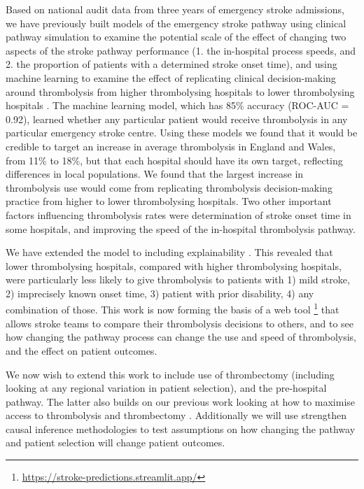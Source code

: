 Based on national audit data from three years of emergency stroke admissions, we have previously built models of the emergency stroke pathway using clinical pathway simulation to examine the potential scale of the effect of changing two aspects of the stroke pathway performance (1. the in-hospital process speeds, and 2. the proportion of patients with a determined stroke onset time), and using machine learning to examine the effect of replicating clinical decision-making around thrombolysis from higher thrombolysing hospitals to lower thrombolysing hospitals \cite{allen_using_2022, allen_use_2022}. The machine learning model, which has 85\% accuracy (ROC-AUC = 0.92), learned whether any particular patient would receive thrombolysis in any particular emergency stroke centre. Using these models we found that it would be credible to target an increase in average thrombolysis in England and Wales, from 11\% to 18\%, but that each hospital should have its own target, reflecting differences in local populations. We found that the largest increase in thrombolysis use would come from replicating thrombolysis decision-making practice from higher to lower thrombolysing hospitals. Two other important factors influencing thrombolysis rates were determination of stroke onset time in some hospitals, and improving the speed of the in-hospital thrombolysis pathway.

We have extended the model to including explainability \cite{pearn_what_2023}. This revealed that lower thrombolysing hospitals, compared with higher thrombolysing hospitals, were particularly less likely to give thrombolysis to patients with 1) mild stroke, 2) imprecisely known onset time, 3) patient with prior disability, 4) any combination of those. This work is now forming the basis of a web tool \footnote{\url{https://stroke-predictions.streamlit.app/}} that allows stroke teams to compare their thrombolysis decisions to others, and to see how changing the pathway process can change the use and speed of thrombolysis, and the effect on patient outcomes.

We now wish to extend this work to include use of thrombectomy (including looking at any regional variation in patient selection), and the pre-hospital pathway. The latter also builds on our previous work looking at how to maximise access to thrombolysis and thrombectomy \cite{allen_maximising_2019}. Additionally we will use strengthen causal inference methodologies to test assumptions on how changing the pathway and patient selection will change patient outcomes.

